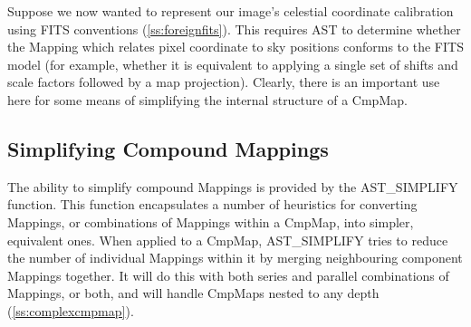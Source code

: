 \documentclass[twoside,11pt]{article}
\newcommand{\htmlref}[2]{#1}
\newcommand{\secref}[1]{\S\ref{#1}}
\renewcommand{\secref}[1]{\ref{#1}}
\begin{document}
Suppose we now wanted to represent our image's celestial coordinate
calibration using FITS conventions (\secref{ss:foreignfits}). This
requires AST to determine whether the Mapping which relates pixel
coordinate to sky positions conforms to the FITS model (for example,
whether it is equivalent to applying a single set of shifts and scale
factors followed by a map projection). Clearly, there is an important
use here for some means of simplifying the internal structure of a
CmpMap.

\subsection{\label{ss:simplifyingcmpmaps}Simplifying Compound Mappings}

The ability to simplify compound Mappings is provided by the
\htmlref{AST\_SIMPLIFY}{AST_SIMPLIFY} function. This function encapsulates a number of
heuristics for converting Mappings, or combinations of Mappings within
a \htmlref{CmpMap}{CmpMap}, into simpler, equivalent ones. When applied to a CmpMap,
AST\_SIMPLIFY tries to reduce the number of individual Mappings within
it by merging neighbouring component Mappings together. It will do
this with both series and parallel combinations of Mappings, or both,
and will handle CmpMaps nested to any depth
(\secref{ss:complexcmpmap}).
\end{document}
